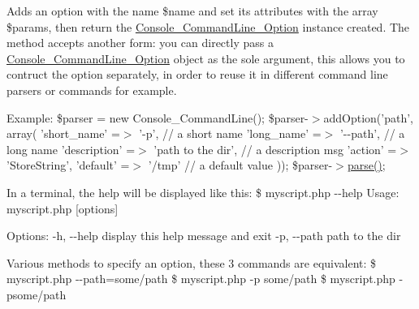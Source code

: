 Adds an option with the name \$name and set its attributes with the array \$params, then return the \hyperlink{class_console___command_line___option}{Console\_\-CommandLine\_\-Option} instance created. The method accepts another form: you can directly pass a \hyperlink{class_console___command_line___option}{Console\_\-CommandLine\_\-Option} object as the sole argument, this allows you to contruct the option separately, in order to reuse it in different command line parsers or commands for example.

Example: {\ttfamily  \$parser = new Console\_\-CommandLine(); \$parser-\/$>$addOption('path', array( 'short\_\-name' =$>$ '-\/p', // a short name 'long\_\-name' =$>$ '-\/-\/path', // a long name 'description' =$>$ 'path to the dir', // a description msg 'action' =$>$ 'StoreString', 'default' =$>$ '/tmp' // a default value )); \$parser-\/$>$\hyperlink{class_console___command_line_abbb06a97b917ba9cef5341add43f8634}{parse()}; }

In a terminal, the help will be displayed like this: {\ttfamily  \$ myscript.php -\/-\/help Usage: myscript.php \mbox{[}options\mbox{]}}

{\ttfamily  Options: -\/h, -\/-\/help display this help message and exit -\/p, -\/-\/path path to the dir}

{\ttfamily  }

Various methods to specify an option, these 3 commands are equivalent: {\ttfamily  \$ myscript.php -\/-\/path=some/path \$ myscript.php -\/p some/path \$ myscript.php -\/psome/path }


